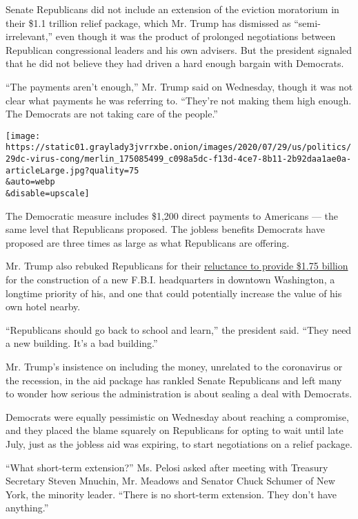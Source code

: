 Senate Republicans did not include an extension of the eviction
moratorium in their \$1.1 trillion relief package, which Mr. Trump has
dismissed as ``semi-irrelevant,'' even though it was the product of
prolonged negotiations between Republican congressional leaders and his
own advisers. But the president signaled that he did not believe they
had driven a hard enough bargain with Democrats.

``The payments aren't enough,'' Mr. Trump said on Wednesday, though it
was not clear what payments he was referring to. ``They're not making
them high enough. The Democrats are not taking care of the people.''

\texttt{[image: https://static01.graylady3jvrrxbe.onion/images/2020/07/29/us/politics/29dc-virus-cong/merlin\_175085499\_c098a5dc-f13d-4ce7-8b11-2b92daa1ae0a-articleLarge.jpg?quality=75\\\&auto=webp\\\&disable=upscale]}

The Democratic measure includes \$1,200 direct payments to Americans ---
the same level that Republicans proposed. The jobless benefits Democrats
have proposed are three times as large as what Republicans are offering.

Mr. Trump also rebuked Republicans for their
\href{https://www.nytimes3xbfgragh.onion/2020/07/28/us/politics/republicans-trump-fbi-building-virus-relief-bill.html}{reluctance
to provide \$1.75 billion} for the construction of a new F.B.I.
headquarters in downtown Washington, a longtime priority of his, and one
that could potentially increase the value of his own hotel nearby.

``Republicans should go back to school and learn,'' the president said.
``They need a new building. It's a bad building.''

Mr. Trump's insistence on including the money, unrelated to the
coronavirus or the recession, in the aid package has rankled Senate
Republicans and left many to wonder how serious the administration is
about sealing a deal with Democrats.

Democrats were equally pessimistic on Wednesday about reaching a
compromise, and they placed the blame squarely on Republicans for opting
to wait until late July, just as the jobless aid was expiring, to start
negotiations on a relief package.

``What short-term extension?'' Ms. Pelosi asked after meeting with
Treasury Secretary Steven Mnuchin, Mr. Meadows and Senator Chuck Schumer
of New York, the minority leader. ``There is no short-term extension.
They don't have anything.''

